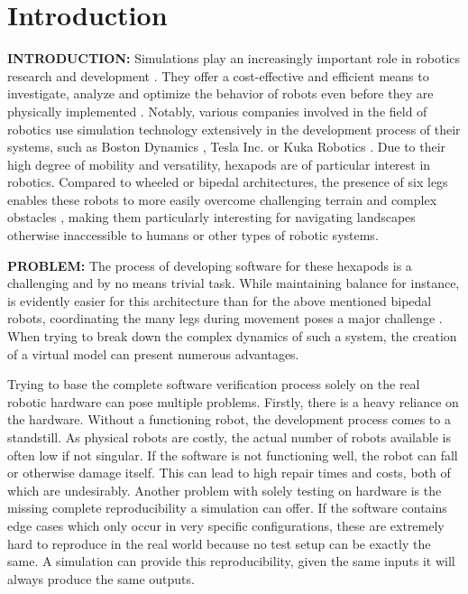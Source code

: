 \chapter{Introduction}
\label{ch:introduction}




\textbf{INTRODUCTION:}
Simulations play an increasingly important role in robotics research and development \parencite{afzal2020study}. 
They offer a cost-effective and efficient means to investigate, analyze and optimize the behavior of robots even before they are physically implemented \parencite{de2019analysis}. 
Notably, various companies involved in the field of robotics use simulation technology extensively in the development process of their systems, such as Boston Dynamics \parencite{BostonDynamicsSimulation}, Tesla Inc. \parencite{TeslaAiDay2022} or Kuka Robotics \parencite{KukaSim}.
Due to their high degree of mobility and versatility, hexapods are of particular interest in robotics. 
Compared to wheeled or bipedal architectures, the presence of six legs enables these robots to more easily overcome challenging terrain and complex obstacles \parencite{barai2013smart, atifystructure}, making them particularly interesting for navigating landscapes otherwise inaccessible to humans or other types of robotic systems.


\textbf{PROBLEM:}
The process of developing software for these hexapods is a challenging and by no means trivial task.
While maintaining balance for instance, is evidently easier for this architecture than for the above mentioned bipedal robots, coordinating the many legs during movement poses a major challenge \parencite{azayev2020blind,schilling2013walknet}.
When trying to break down the complex dynamics of such a system, the creation of a virtual model can present 
numerous advantages.

Trying to base the complete software verification process solely on the real robotic hardware can pose multiple problems.
Firstly, there is a heavy reliance on the hardware.
Without a functioning robot, the development process comes to a standstill.
As physical robots are costly, the actual number of robots available is often low if not singular.
If the software is not functioning well, the robot can fall or otherwise damage itself.
This can lead to high repair times and costs, both of which are undesirably.
Another problem with solely testing on hardware is the missing complete reproducibility a simulation can offer.
If the software contains edge cases which only occur in very specific configurations, these are extremely hard to reproduce in the real world because no test setup can be exactly the same.
A simulation can provide this reproducibility, given the same inputs it will always produce the same outputs.

